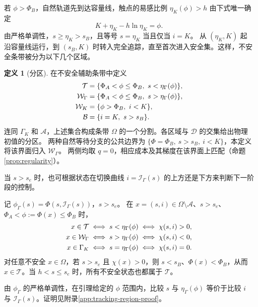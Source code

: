 \documentclass[lang=cn,a4paper,newtx]{elegantpaper}
\theoremstyle{plain}
\theoremstyle{definition}
\newtheorem{paperdefinition}[theorem]{定义}
\newcommand{\Acal}{\mathcal A}
\newcommand{\Dcal}{\mathcal D}
\begin{document}
若 $\phi>\Phi_B$，自然轨道先到达容量线，触点的易感比例 $\eta_K(\phi)>h$ 由下式唯一确定
\begin{equation}
K+\eta_K-h\ln\eta_K=\phi.
\label{eq:capacity-hit-map}
\end{equation}
由严格单调性，$s\ge\eta_K>s_B$，且等号 $s=\eta_K$ 当且仅当 $i=K$。
从 $(\eta_K,K)$ 起沿容量线运行，到 $(s_B,K)$ 时转入完全追踪，直至首次进入安全集。这样，不安全条带被分为以下几个区域。

\begin{paperdefinition}[分区]
\label{def:regions}
在不安全辅助条带中定义
\begin{align}
\mathcal T&=\{\Phi_A<\phi\le\Phi_B,\ s<\eta_\Gamma(\phi)\},\notag\\
\mathcal W_\Gamma&=\{\Phi_A<\phi\le\Phi_B,\ s>\eta_\Gamma(\phi)\},\notag\\
\mathcal W_K&=\{\phi>\Phi_B,\ i<K\},\notag\\
\mathcal B&=\{i=K,\ s>s_B\}.\label{eq:regions}
\end{align}
连同 $\Gamma_K$ 和 $\Acal$，上述集合构成条带 $\Omega$ 的一个分割。各区域与 $\Dcal$ 的交集给出物理初值的分区。
两种自然等待分支的公共边界为
$\{\Phi=\Phi_B,\ s>s_B,\ i<K\}$，本定义将该界面归入 $\mathcal W_\Gamma$。
两侧均取 $q=0$，相应成本及其梯度在该界面上匹配（命题\ref{prop:regularity}）。
\end{paperdefinition}

当 $s>s_e$ 时，也可根据状态在切换曲线 $i=\mathcal I_\Gamma(s)$ 的上方还是下方来判断下一阶段的控制。

\begin{lemma}[切换界面两侧与分区的对应]
\label{lem:chi-regions}
记 $\phi_\Gamma(s)=\Phi(s,\mathcal I_\Gamma(s))$，$s>s_e$。
在 $x=(s,i)\in\Omega\setminus\Acal$、$s>s_e$、$\Phi_A<\phi:=\Phi(x)\le\Phi_B$ 时，
\begin{align}
x\in\mathcal T&\iff s<\eta_\Gamma(\phi)\iff\chi(s,i)>0,\notag\\
x\in\mathcal W_\Gamma&\iff s>\eta_\Gamma(\phi)\iff\chi(s,i)<0,\notag\\
x\in\Gamma_K&\iff s=\eta_\Gamma(\phi)\iff\chi(s,i)=0.
\label{eq:chi-regions}
\end{align}
对任意不安全 $x\in\Omega$，若 $s>s_e$ 且 $\chi(x)>0$，则 $s<s_B$、$\Phi(x)<\Phi_B$，从而 $x\in\mathcal T$。当 $h<s\le s_e$ 时，所有不安全状态也都属于 $\mathcal T$。
\end{lemma}
由 $\phi_\Gamma$ 的严格单调性，在引理给定的 $\phi$ 范围内，比较 $s$ 与 $\eta_\Gamma(\phi)$ 等价于比较 $i$ 与 $\mathcal I_\Gamma(s)$。证明见附录\ref{app:tracking-region-proof}。
\end{document}
